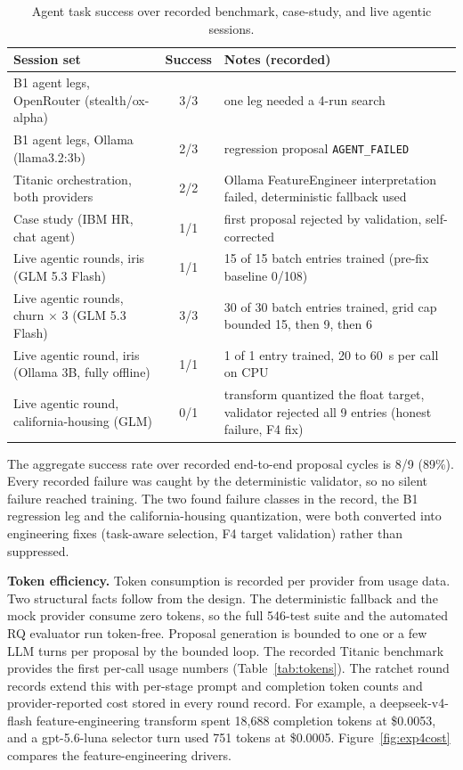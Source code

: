 \begin{table}[H]
\centering
\caption{Agent task success over recorded benchmark, case-study, and live agentic sessions.}
\label{tab:agentsuccess}
\small
\begin{tabular}{p{4.6cm}cp{7.2cm}}
\toprule
\textbf{Session set} & \textbf{Success} & \textbf{Notes (recorded)} \\
\midrule
B1 agent legs, OpenRouter (stealth/ox-alpha) & 3/3 & one leg needed a 4-run search \\
B1 agent legs, Ollama (llama3.2:3b) & 2/3 & regression proposal \texttt{AGENT\_FAILED} \\
Titanic orchestration, both providers & 2/2 & Ollama FeatureEngineer interpretation failed, deterministic fallback used \\
Case study (IBM HR, chat agent) & 1/1 & first proposal rejected by validation, self-corrected \\
Live agentic rounds, iris (GLM 5.3 Flash) & 1/1 & 15 of 15 batch entries trained (pre-fix baseline 0/108) \\
Live agentic rounds, churn $\times$ 3 (GLM 5.3 Flash) & 3/3 & 30 of 30 batch entries trained, grid cap bounded 15, then 9, then 6 \\
Live agentic round, iris (Ollama 3B, fully offline) & 1/1 & 1 of 1 entry trained, 20 to 60~s per call on CPU \\
Live agentic round, california-housing (GLM) & 0/1 & transform quantized the float target, validator rejected all 9 entries (honest failure, F4 fix) \\
\bottomrule
\end{tabular}
\end{table}

The aggregate success rate over recorded end-to-end proposal cycles is 8/9 (89\%). Every recorded failure was caught by the deterministic validator, so no silent failure reached training. The two found failure classes in the record, the B1 regression leg and the california-housing quantization, were both converted into engineering fixes (task-aware selection, F4 target validation) rather than suppressed.

\textbf{Token efficiency.} Token consumption is recorded per provider from usage data. Two structural facts follow from the design. The deterministic fallback and the mock provider consume zero tokens, so the full 546-test suite and the automated RQ evaluator run token-free. Proposal generation is bounded to one or a few LLM turns per proposal by the bounded loop. The recorded Titanic benchmark provides the first per-call usage numbers (Table~\ref{tab:tokens}). The ratchet round records extend this with per-stage prompt and completion token counts and provider-reported cost stored in every round record. For example, a deepseek-v4-flash feature-engineering transform spent 18{,}688 completion tokens at \$0.0053, and a gpt-5.6-luna selector turn used 751 tokens at \$0.0005. Figure~\ref{fig:exp4cost} compares the feature-engineering drivers.


